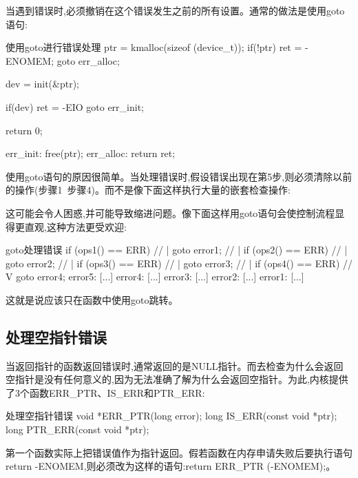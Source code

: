 \documentclass[lang=cn,newtx,10pt,scheme=chinese]{elegantbook}
\begin{document}
当遇到错误时,必须撤销在这个错误发生之前的所有设置。通常的做法是使用goto语句:

\begin{mycode}{使用goto进行错误处理}
ptr = kmalloc(sizeof (device_t));
if(!ptr) {
    ret = -ENOMEM;
    goto err_alloc;
}

dev = init(&ptr);

if(dev) {
    ret = -EIO
    goto err_init;
}

return 0;

err_init:
    free(ptr);
err_alloc:
    return ret;
\end{mycode}

使用goto语句的原因很简单。当处理错误时,假设错误出现在第5步,则必须清除以前的操作(步骤1~步骤4)。而不是像下面这样执行大量的嵌套检查操作:

\begin{mycode}{嵌套处理}
if (ops1() != ERR) {
    if (ops2() != ERR) {
        if ( ops3() != ERR) {
            if (ops4() != ERR) {
\end{mycode}

这可能会令人困惑,并可能导致缩进问题。像下面这样用goto语句会使控制流程显得更直观,这种方法更受欢迎:

\begin{mycode}{goto处理错误}
if (ops1() == ERR) // |
    goto error1;   // |
if (ops2() == ERR) // |
    goto error2;   // |
if (ops3() == ERR) // |
    goto error3;   // |
if (ops4() == ERR) // V
    goto error4;
error5:
[...]
error4:
[...]
error3:
[...]
error2:
[...]
error1:
[...]
\end{mycode}

这就是说应该只在函数中使用goto跳转。

\subsection{处理空指针错误}

当返回指针的函数返回错误时,通常返回的是NULL指针。而去检查为什么会返回空指针是没有任何意义的,因为无法准确了解为什么会返回空指针。为此,内核提供了3个函数ERR\_PTR、IS\_ERR和PTR\_ERR:

\begin{mycode}{处理空指针错误}
void *ERR_PTR(long error);
long IS_ERR(const void *ptr);
long PTR_ERR(const void *ptr);
\end{mycode}

第一个函数实际上把错误值作为指针返回。假若函数在内存申请失败后要执行语句return -ENOMEM,则必须改为这样的语句:return ERR\_PTR (-ENOMEM);。
\end{document}
